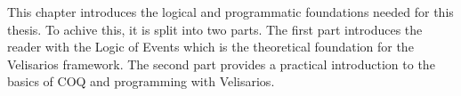 








This chapter introduces the logical and programmatic foundations needed for this
thesis. To achive this, it is split into two parts. The first part introduces
the reader with the Logic of Events which is the theoretical foundation for the
Velisarios framework. The second part provides a practical introduction to
the basics of COQ and programming with Velisarios.

